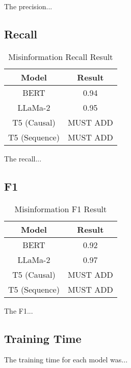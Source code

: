 The precision...


\subsection{Recall}
\begin{table}[ht!]
	\centering
	\caption{Misinformation Recall Result}
	\begin{tabular}{||c | c||} 
		\hline
		\textbf{Model} & \textbf{Result} \\ [0.5ex] 
		\hline
		BERT & 0.94  \\
		\hline
		LLaMa-2 & 0.95 \\ 
		\hline
		T5 (Causal) & MUST ADD \\
		\hline
		T5 (Sequence) & MUST ADD \\
		\hline
	\end{tabular}
	\label{table:MisinformationRecall}
\end{table}

The recall...


\subsection{F1}
\begin{table}[ht!]
	\centering
	\caption{Misinformation F1 Result}
	\begin{tabular}{||c | c||} 
		\hline
		\textbf{Model} & \textbf{Result} \\ [0.5ex] 
		\hline
		BERT & 0.92  \\
		\hline
		LLaMa-2 & 0.97 \\ 
		\hline
		T5 (Causal) & MUST ADD \\
		\hline
		T5 (Sequence) & MUST ADD \\
		\hline
	\end{tabular}
	\label{table:MisinformationF1}
\end{table}

The F1...


\subsection{Training Time}

The training time for each model was...




